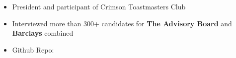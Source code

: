 %
%
%

{
\vspace{1em}
\begin{itemize}
	\item President and participant of Crimson Toastmasters Club
	\item Interviewed more than 300+ candidates for \textbf{The Advisory Board} and \textbf{Barclays} combined             
    \item Github Repo: 
\end{itemize}
}
